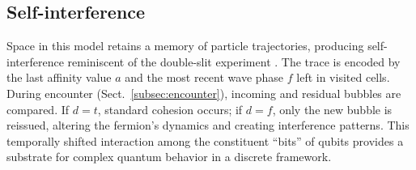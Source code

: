 \documentclass{ijuc}
\begin{document}
\subsection{Self-interference\label{subsec:Interference}}
Space in this model retains a memory of particle trajectories, producing self-interference reminiscent of the double-slit experiment \cite{feynman-2}. The trace is encoded by the last affinity value $a$ and the most recent wave phase $f$ left in visited cells.
During encounter (Sect.~\ref{subsec:encounter}), incoming and residual bubbles are compared. If $d=t$, standard cohesion occurs; if $d=f$, only the new bubble is reissued, altering the fermion's dynamics and creating interference patterns. This temporally shifted interaction among the constituent ``bits'' of qubits provides a substrate for complex quantum behavior in a discrete framework.
\end{document}
